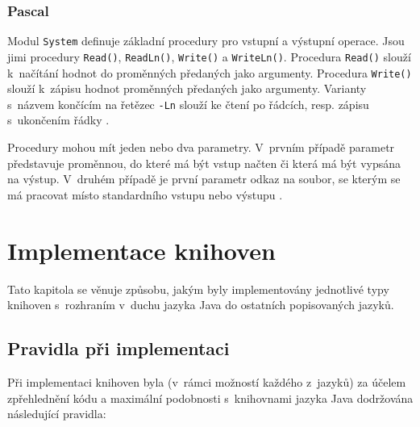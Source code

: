 \documentclass[czech,BP]{thesiskiv}
\begin{document}
\subsection{Pascal}
Modul \texttt{System} definuje základní procedury pro vstupní a výstupní operace. Jsou jimi procedury \texttt{Read()}, \texttt{ReadLn()}, \texttt{Write()} a \texttt{WriteLn()}. Procedura \texttt{Read()} slouží k~načítání hodnot do proměnných předaných jako argumenty. Procedura \texttt{Write()} slouží k~zápisu hodnot proměnných předaných jako argumenty. Varianty s~názvem končícím na řetězec \texttt{-Ln} slouží ke čtení po řádcích, resp. zápisu s~ukončením řádky \cite{pas-guide-system, pas-guide-read, pas-guide-write, pas-guide-readln, pas-guide-writeln}.\par
Procedury mohou mít jeden nebo dva parametry. V~prvním případě parametr představuje proměnnou, do které má být vstup načten či která má být vypsána na výstup. V~druhém případě je první parametr odkaz na soubor, se kterým se má pracovat místo standardního vstupu nebo výstupu \cite{pas-guide-read, pas-guide-write, pas-guide-readln, pas-guide-writeln}.

\chapter{Implementace knihoven}
Tato kapitola se věnuje způsobu, jakým byly implementovány jednotlivé typy knihoven s~rozhraním v~duchu jazyka Java do ostatních popisovaných jazyků.

\section{Pravidla při implementaci}
Při implementaci knihoven byla (v~rámci možností každého z~jazyků) za účelem zpřehlednění kódu a maximální podobnosti s~knihovnami jazyka Java dodržována následující pravidla:
\end{document}
